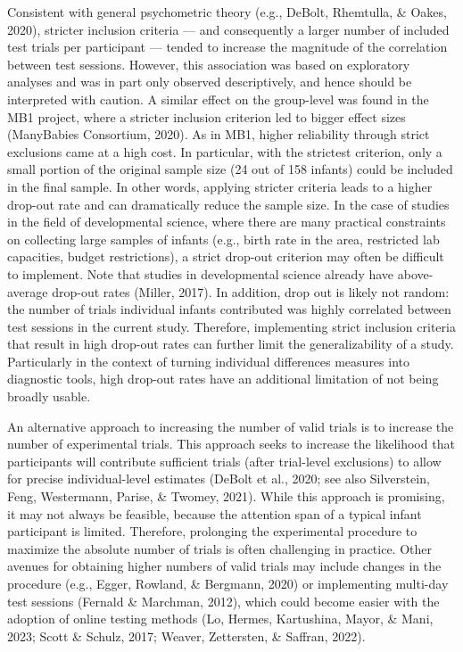 \documentclass[
  man,floatsintext]{apa6}
\begin{document}
Consistent with general psychometric theory (e.g., DeBolt, Rhemtulla, \& Oakes, 2020), stricter inclusion criteria --- and consequently a larger number of included test trials per participant --- tended to increase the magnitude of the correlation between test sessions.
However, this association was based on exploratory analyses and was in part only observed descriptively, and hence should be interpreted with caution.
A similar effect on the group-level was found in the MB1 project, where a stricter inclusion criterion led to bigger effect sizes (ManyBabies Consortium, 2020).
As in MB1, higher reliability through strict exclusions came at a high cost.
In particular, with the strictest criterion, only a small portion of the original sample size (24 out of 158 infants) could be included in the final sample.
In other words, applying stricter criteria leads to a higher drop-out rate and can dramatically reduce the sample size.
In the case of studies in the field of developmental science, where there are many practical constraints on collecting large samples of infants (e.g., birth rate in the area, restricted lab capacities, budget restrictions), a strict drop-out criterion may often be difficult to implement.
Note that studies in developmental science already have above-average drop-out rates (Miller, 2017).
In addition, drop out is likely not random: the number of trials individual infants contributed was highly correlated between test sessions in the current study.
Therefore, implementing strict inclusion criteria that result in high drop-out rates can further limit the generalizability of a study.
Particularly in the context of turning individual differences measures into diagnostic tools, high drop-out rates have an additional limitation of not being broadly usable.

An alternative approach to increasing the number of valid trials is to increase the number of experimental trials.
This approach seeks to increase the likelihood that participants will contribute sufficient trials (after trial-level exclusions) to allow for precise individual-level estimates (DeBolt et al., 2020; see also Silverstein, Feng, Westermann, Parise, \& Twomey, 2021).
While this approach is promising, it may not always be feasible, because the attention span of a typical infant participant is limited.
Therefore, prolonging the experimental procedure to maximize the absolute number of trials is often challenging in practice.
Other avenues for obtaining higher numbers of valid trials may include changes in the procedure (e.g., Egger, Rowland, \& Bergmann, 2020) or implementing multi-day test sessions (Fernald \& Marchman, 2012), which could become easier with the adoption of online testing methods (Lo, Hermes, Kartushina, Mayor, \& Mani, 2023; Scott \& Schulz, 2017; Weaver, Zettersten, \& Saffran, 2022).
\end{document}
